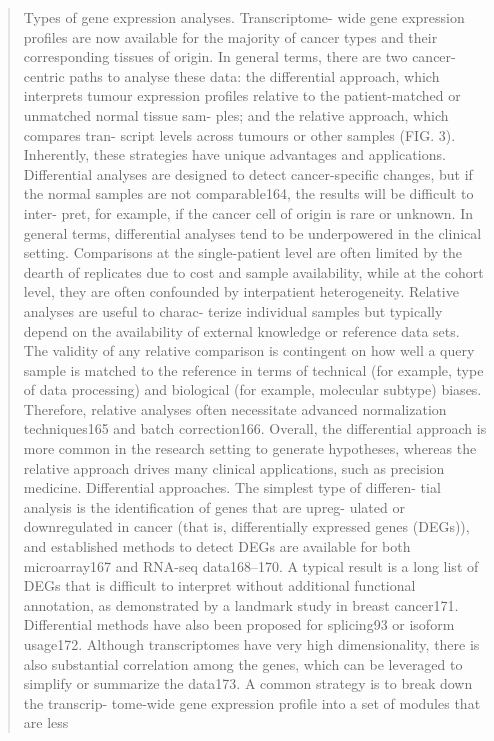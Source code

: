 \documentclass[12pt,]{book}
\theoremstyle{definition}
\theoremstyle{definition}
\theoremstyle{definition}
\theoremstyle{remark}
\begin{document}
\begin{quote}
Types of gene expression analyses. Transcriptome- wide gene expression
profiles are now available for the majority of cancer types and their
corresponding tissues of origin. In general terms, there are two
cancer-centric paths to analyse these data: the differential approach,
which interprets tumour expression profiles relative to the
patient-matched or unmatched normal tissue sam- ples; and the relative
approach, which compares tran- script levels across tumours or other
samples (FIG. 3). Inherently, these strategies have unique advantages
and applications. Differential analyses are designed to detect
cancer-specific changes, but if the normal samples are not
comparable164, the results will be difficult to inter- pret, for
example, if the cancer cell of origin is rare or unknown. In general
terms, differential analyses tend to be underpowered in the clinical
setting. Comparisons at the single-patient level are often limited by
the dearth of replicates due to cost and sample availability, while at
the cohort level, they are often confounded by interpatient
heterogeneity. Relative analyses are useful to charac- terize individual
samples but typically depend on the availability of external knowledge
or reference data sets. The validity of any relative comparison is
contingent on how well a query sample is matched to the reference in
terms of technical (for example, type of data processing) and biological
(for example, molecular subtype) biases. Therefore, relative analyses
often necessitate advanced normalization techniques165 and batch
correction166. Overall, the differential approach is more common in the
research setting to generate hypotheses, whereas the relative approach
drives many clinical applications, such as precision medicine.
Differential approaches. The simplest type of differen- tial analysis is
the identification of genes that are upreg- ulated or downregulated in
cancer (that is, differentially expressed genes (DEGs)), and established
methods to detect DEGs are available for both microarray167 and RNA-seq
data168--170. A typical result is a long list of DEGs that is difficult
to interpret without additional functional annotation, as demonstrated
by a landmark study in breast cancer171. Differential methods have also
been proposed for splicing93 or isoform usage172. Although
transcriptomes have very high dimensionality, there is also substantial
correlation among the genes, which can be leveraged to simplify or
summarize the data173. A common strategy is to break down the transcrip-
tome-wide gene expression profile into a set of modules that are less

\end{quote}
\end{document}
